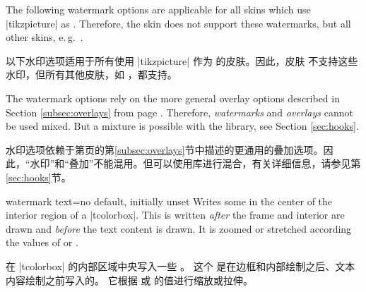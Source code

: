 The following watermark options are applicable for all skins which
use |tikzpicture| as .
Therefore, the skin  does not support these watermarks,
but all other skins, e.\,g.\ .

以下水印选项适用于所有使用 |tikzpicture| 作为  的皮肤。因此，皮肤  不支持这些水印，但所有其他皮肤，如 ，都支持。

\begin{marker}
The watermark options rely on the more general overlay options described in
Section \ref{subsec:overlays} from page \pageref{subsec:overlays}.
Therefore, \emph{watermarks} and \emph{overlays} cannot be used mixed.
But a mixture is possible with the  library, see Section \ref{sec:hooks}.

水印选项依赖于第\pageref{subsec:overlays}页的第\ref{subsec:overlays}节中描述的更通用的叠加选项。因此，“水印”和“叠加”不能混用。但可以使用库进行混合，有关详细信息，请参见第\ref{sec:hooks}节。
\end{marker}


\begin{docTcbKey}{watermark text}{=}{no default, initially unset}
Writes some  in the center of the interior region of a |tcolorbox|.
This  is written \emph{after} the
frame and interior are drawn and \emph{before} the text content is drawn.
It is zoomed or stretched according the values of
 or .

在 |tcolorbox| 的内部区域中央写入一些 。 这个  是在边框和内部绘制之后、文本内容绘制之前写入的。 它根据  或  的值进行缩放或拉伸。
\begin{dispExample}

\begin{tcolorbox}[enhanced,title=My title,watermark text=My Watermark]
\lipsum[1]
\tcblower
\lipsum[2]
\end{tcolorbox}
\end{dispExample}
\end{docTcbKey}

\enlargethispage*{1cm}

